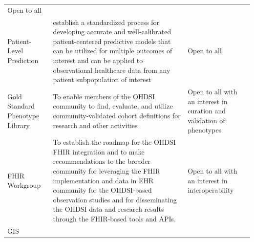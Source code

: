 \documentclass[11pt]{book}
\theoremstyle{definition}
\theoremstyle{definition}
\theoremstyle{definition}
\theoremstyle{remark}
\begin{document}
\begin{longtable}[]{@{}lll@{}}
\begin{minipage}[t]{0.14\columnwidth}
Open to all\strut
\end{minipage}\tabularnewline
\begin{minipage}[t]{0.08\columnwidth}\raggedright\strut
Patient-Level Prediction\strut
\end{minipage} & \begin{minipage}[t]{0.25\columnwidth}\raggedright\strut
establish a standardized process for developing accurate and
well-calibrated patient-centered predictive models that can be utilized
for multiple outcomes of interest and can be applied to observational
healthcare data from any patient subpopulation of interest\strut
\end{minipage} & \begin{minipage}[t]{0.14\columnwidth}\raggedright\strut
Open to all\strut
\end{minipage}\tabularnewline
\begin{minipage}[t]{0.08\columnwidth}\raggedright\strut
Gold Standard Phenotype Library\strut
\end{minipage} & \begin{minipage}[t]{0.25\columnwidth}\raggedright\strut
To enable members of the OHDSI community to find, evaluate, and utilize
community-validated cohort definitions for research and other
activities\strut
\end{minipage} & \begin{minipage}[t]{0.14\columnwidth}\raggedright\strut
Open to all with an interest in curation and validation of
phenotypes\strut
\end{minipage}\tabularnewline
\begin{minipage}[t]{0.08\columnwidth}\raggedright\strut
FHIR Workgroup\strut
\end{minipage} & \begin{minipage}[t]{0.25\columnwidth}\raggedright\strut
To establish the roadmap for the OHDSI FHIR integration and to make
recommendations to the broader community for leveraging the FHIR
implementation and data in EHR community for the OHDSI-based observation
studies and for disseminating the OHDSI data and research results
through the FHIR-based tools and APIs.\strut
\end{minipage} & \begin{minipage}[t]{0.14\columnwidth}\raggedright\strut
Open to all with an interest in interoperability\strut
\end{minipage}\tabularnewline
\begin{minipage}[t]{0.08\columnwidth}\raggedright\strut
GIS\strut
\end{minipage} & \begin{minipage}[t]{0.25\columnwidth}\raggedright\strut

\end{minipage}
\end{longtable}
\end{document}
